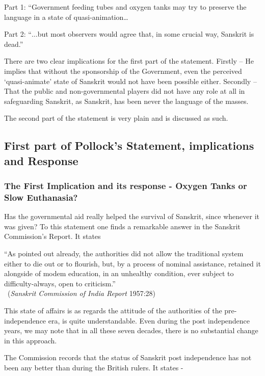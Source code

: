 Part 1:  “Government feeding tubes and oxygen tanks may try to preserve the language in a state of quasi-animation…

Part 2:  “$\ldots$but most observers would agree that, in some crucial way, Sanskrit is dead.”

There are two clear implications for the first part of the statement. Firstly – He implies that without the sponsorship of the Government, even the perceived ‘quasi-animate’ state of Sanskrit would not have been possible either. Secondly – That the public and non-governmental players did not have any role at all in safeguarding Sanskrit, as Sanskrit, has been never the language of the masses. 

The second part of the statement is very plain and is discussed as such.

\subsection{First part of Pollock’s Statement, implications and Response}

\subsubsection{The First Implication and its response - Oxygen Tanks or Slow Euthanasia?}

Has the governmental aid really helped the survival of Sanskrit, since whenever it was given? To this statement one finds a remarkable answer in the Sanskrit Commission's Report. It states 

\begin{myquote}
\eleven
 “As pointed out already, the authorities did not allow the traditional system either to die out or to flourish, but, by a process of nominal assistance, retained it alongside of modem education, in an unhealthy condition, ever subject to difficulty-always, open to criticism.”\\[-15pt] 
 
 ~\hfill({\sl Sanskrit Commission of India Report} 1957:28)
\end{myquote}
 
This state of affairs is as regards the attitude of the authorities of the pre-independence era, is quite understandable. Even during the post independence years, we may note that in all these seven decades, there is no substantial change in this approach. 

The Commission records that the status of Sanskrit post independence has not been any better than during the British rulers. It states -

